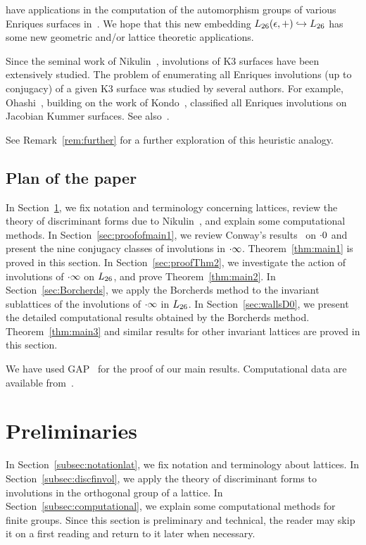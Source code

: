 \documentclass{amsart} %
\begin{document}
have applications in the computation of the automorphism groups
of various Enriques surfaces in~\cite{MR4498439}.
We hope that this new embedding  $L_{26}(\epsilon, +)\hookrightarrow L_{26}$
has some new geometric and/or lattice theoretic applications.
%
\par
Since the seminal work of Nikulin~\cite{MR633160}, 
involutions of K3 surfaces have been extensively studied.
The problem of enumerating all Enriques involutions 
(up to conjugacy) of a given K3 surface was
studied by several authors.
For example, Ohashi~\cite{MR2552959},
building on the work of Kondo~\cite{MR1618132}, 
 classified all Enriques involutions on Jacobian Kummer surfaces. 
 See also~\cite{MR4288644}.
%
\par
See  Remark~\ref{rem:further}
for a further exploration of this heuristic analogy.
%
\subsection{Plan of the paper}\label{subsec:plan}
%
In Section~\ref{sec:prelim},
we fix notation and terminology concerning lattices, 
review the theory of discriminant forms
due to Nikulin~\cite{MR525944}, 
and explain some computational methods.
In Section~\ref{sec:proofofmain1},
we review Conway's results~\cite[Chapter 10]{theCSbook} on $\cdot 0$
and present the nine conjugacy classes of involutions in $\cdot \infty$.
Theorem~\ref{thm:main1} is proved in this section.
In Section~\ref{sec:proofThm2},
we investigate the action of involutions of $\cdot \infty$ on $L_{26}$,
and prove Theorem~\ref{thm:main2}.
In Section~\ref{sec:Borcherds},
we apply the Borcherds method to the invariant sublattices of the involutions 
of $\cdot \infty$ in $L_{26}$.
In Section~\ref{sec:wallsD0},
we present the detailed computational results obtained by
 the Borcherds method.
 Theorem~\ref{thm:main3} and similar results for other invariant lattices are proved in this section.
%
\par
We have used GAP~\cite{GAP4} 
for the proof of our main results.
Computational data are available from~\cite{affConwayCompdata}.
%
\section{Preliminaries}\label{sec:prelim}
%
In Section~\ref{subsec:notationlat}, 
we fix notation and terminology about lattices.
In Section~\ref{subsec:discfinvol},
we apply the theory of discriminant forms
to  involutions in the orthogonal group of a lattice.
In Section~\ref{subsec:computational},
we explain some computational methods 
for finite groups.
Since this section is preliminary and technical, the reader may skip it on a first reading and return to it later when necessary.
%
%
\end{document}
